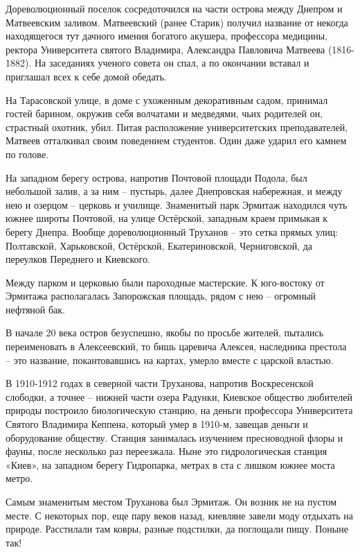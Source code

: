 Дореволюционный поселок сосредоточился на части острова между Днепром и Матвеевским заливом. Матвеевский (ранее Старик) получил название от некогда находящегося тут дачного имения богатого акушера, профессора медицины, ректора Университета святого Владимира, Александра Павловича Матвеева (1816-1882). На заседаниях ученого совета он спал, а по окончании вставал и приглашал всех к себе домой обедать.

На Тарасовской улице, в доме с ухоженным декоративным садом, принимал гостей барином, окружив себя волчатами и медведями, чьих родителей он, страстный охотник, убил. Питая расположение университетских преподавателей, Матвеев отталкивал своим поведением студентов. Один даже ударил его камнем по голове.

На западном берегу острова, напротив Почтовой площади Подола, был небольшой залив, а за ним – пустырь, далее Днепровская набережная, и между нею и озерцом – церковь и училище. Знаменитый парк Эрмитаж находился чуть южнее широты Почтовой, на улице Остёрской, западным краем примыкая к берегу Днепра. Вообще дореволюционный Труханов – это сетка прямых улиц: Полтавской, Харьковской, Остёрской, Екатериновской, Черниговской, да переулков Переднего и Киевского. 

Между парком и церковью были пароходные мастерские. К юго-востоку от Эрмитажа располагалась Запорожская площадь, рядом с нею – огромный нефтяной бак.

В начале 20 века остров безуспешно, якобы по просьбе жителей, пытались переименовать в Алексеевский, то бишь царевича Алексея, наследника престола – это название, покантовавшись на картах, умерло вместе с царской властью.

В 1910-1912 годах в северной части Труханова, напротив Воскресенской слободки, а точнее – нижней части озера Радунки, Киевское общество любителей природы построило биологическую станцию, на деньги профессора Университета Святого Владимира Кеппена, который умер в 1910-м, завещав деньги и оборудование обществу. Станция занималась изучением пресноводной флоры и фауны, после несколько раз переезжала. Ныне это гидрологическая станция «Киев», на западном берегу Гидропарка, метрах в ста с лишком южнее моста метро.

Самым знаменитым местом Труханова был Эрмитаж. Он возник не на пустом месте. С некоторых пор, еще пару веков назад, киевляне завели моду отдыхать на природе. Расстилали там ковры, разные подстилки, да поглощали пищу. Поныне так!

\newpage
\vspace*{\fill}

